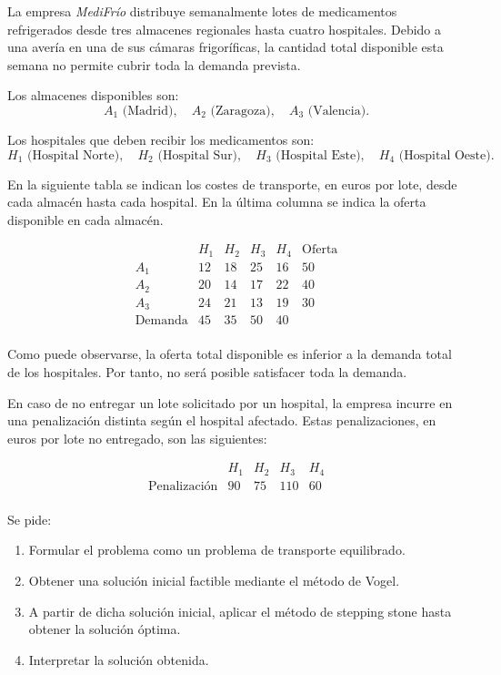 La empresa \textit{MediFrío} distribuye semanalmente lotes de medicamentos refrigerados desde tres almacenes regionales hasta cuatro hospitales. Debido a una avería en una de sus cámaras frigoríficas, la cantidad total disponible esta semana no permite cubrir toda la demanda prevista.

Los almacenes disponibles son:
\[
A_1 \text{ (Madrid)}, \quad A_2 \text{ (Zaragoza)}, \quad A_3 \text{ (Valencia)}.
\]

Los hospitales que deben recibir los medicamentos son:
\[
H_1 \text{ (Hospital Norte)}, \quad
H_2 \text{ (Hospital Sur)}, \quad
H_3 \text{ (Hospital Este)}, \quad
H_4 \text{ (Hospital Oeste)}.
\]

En la siguiente tabla se indican los costes de transporte, en euros por lote, desde cada almacén hasta cada hospital. En la última columna se indica la oferta disponible en cada almacén.

\[
\begin{array}{c|cccc|c}
 & H_1 & H_2 & H_3 & H_4 & \text{Oferta} \\
\hline
A_1 & 12 & 18 & 25 & 16 & 50 \\
A_2 & 20 & 14 & 17 & 22 & 40 \\
A_3 & 24 & 21 & 13 & 19 & 30 \\
\hline
\text{Demanda} & 45 & 35 & 50 & 40 & \\
\end{array}
\]

Como puede observarse, la oferta total disponible es inferior a la demanda total de los hospitales. Por tanto, no será posible satisfacer toda la demanda.

En caso de no entregar un lote solicitado por un hospital, la empresa incurre en una penalización distinta según el hospital afectado. Estas penalizaciones, en euros por lote no entregado, son las siguientes:

\[
\begin{array}{c|cccc}
 & H_1 & H_2 & H_3 & H_4 \\
\hline
\text{Penalización} & 90 & 75 & 110 & 60 \\
\end{array}
\]

Se pide:

\begin{enumerate}
    \item Formular el problema como un problema de transporte equilibrado.

    \item Obtener una solución inicial factible mediante el método de Vogel.

    \item A partir de dicha solución inicial, aplicar el método de stepping stone hasta obtener la solución óptima.

    \item Interpretar la solución obtenida.
\end{enumerate}
